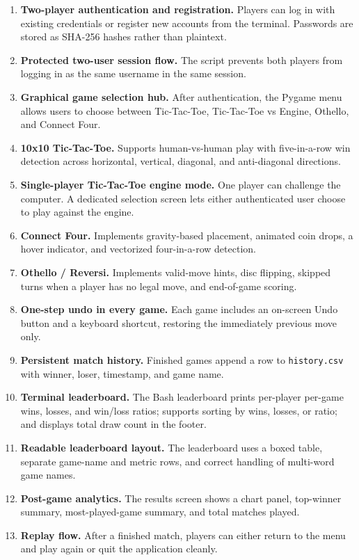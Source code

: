 \documentclass[12pt,a4paper]{article}
\begin{document}
\begin{enumerate}[leftmargin=*]
    \item \textbf{Two-player authentication and registration.} Players can log in with existing credentials or register new accounts from the terminal. Passwords are stored as SHA-256 hashes rather than plaintext.
    \item \textbf{Protected two-user session flow.} The script prevents both players from logging in as the same username in the same session.
    \item \textbf{Graphical game selection hub.} After authentication, the Pygame menu allows users to choose between Tic-Tac-Toe, Tic-Tac-Toe vs Engine, Othello, and Connect Four.
    \item \textbf{10x10 Tic-Tac-Toe.} Supports human-vs-human play with five-in-a-row win detection across horizontal, vertical, diagonal, and anti-diagonal directions.
    \item \textbf{Single-player Tic-Tac-Toe engine mode.} One player can challenge the computer. A dedicated selection screen lets either authenticated user choose to play against the engine.
    \item \textbf{Connect Four.} Implements gravity-based placement, animated coin drops, a hover indicator, and vectorized four-in-a-row detection.
    \item \textbf{Othello / Reversi.} Implements valid-move hints, disc flipping, skipped turns when a player has no legal move, and end-of-game scoring.
    \item \textbf{One-step undo in every game.} Each game includes an on-screen Undo button and a keyboard shortcut, restoring the immediately previous move only.
    \item \textbf{Persistent match history.} Finished games append a row to \texttt{history.csv} with winner, loser, timestamp, and game name.
    \item \textbf{Terminal leaderboard.} The Bash leaderboard prints per-player per-game wins, losses, and win/loss ratios; supports sorting by wins, losses, or ratio; and displays total draw count in the footer.
    \item \textbf{Readable leaderboard layout.} The leaderboard uses a boxed table, separate game-name and metric rows, and correct handling of multi-word game names.
    \item \textbf{Post-game analytics.} The results screen shows a chart panel, top-winner summary, most-played-game summary, and total matches played.
    \item \textbf{Replay flow.} After a finished match, players can either return to the menu and play again or quit the application cleanly.
\end{enumerate}
\end{document}
